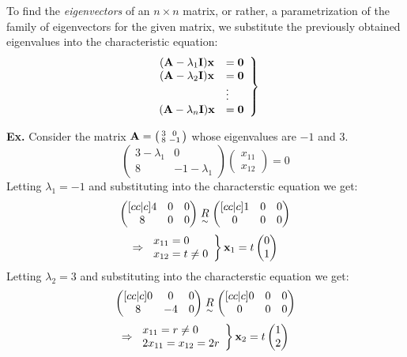 
To find the \emph{eigenvectors} of an $n \times n$ matrix, or rather, a
parametrization of the family of eigenvectors for the given matrix, we
substitute the previously obtained eigenvalues into the characteristic
equation:
\[\left.\begin{array}{clr}
    (\mathbf{A} - \lambda_1\mathbf{I})\mathbf{x} &= \mathbf{0}\\
    (\mathbf{A} - \lambda_2\mathbf{I})\mathbf{x} &= \mathbf{0}\\
                                        &\vdots\\
    (\mathbf{A} - \lambda_n\mathbf{I})\mathbf{x} &= \mathbf{0}
\end{array}\right\}\]

\textbf{Ex.}
Consider the matrix $\mathbf{A} = \left(\begin{smallmatrix} 3 & 0\\ 8 & -1 \end{smallmatrix}\right)$ whose eigenvalues are $-1$ and 3.
\[\begin{pmatrix} 3 - \lambda_1 & 0\\8 & -1 -\lambda_1 \end{pmatrix}
 \begin{pmatrix} x_{11}\\x_{12}\end{pmatrix} = 0\]
Letting $\lambda_1 = -1$ and substituting into the characterstic equation we
get: 
\[\begin{pmatrix}[cc|c] 4 & 0 & 0\\ 8 & 0 & 0 \end{pmatrix} \mathrel{\underset{\sim}{R}} \begin{pmatrix}[cc|c] 1 & 0 & 0\\ 0 & 0 & 0 \end{pmatrix}\]
\[\Rightarrow \left.\begin{array}{lr}
    x_{11}= 0 \\
    x_{12}= t \neq 0
\end{array}\right\}\mathbf{x}_1 = t \begin{pmatrix} 0\\1\end{pmatrix} \]
Letting $\lambda_2 = 3$ and substituting into the characterstic equation we get: 
\[\begin{pmatrix}[cc|c] 0 & 0 & 0\\ 8 & -4 & 0 \end{pmatrix} \mathrel{\underset{\sim}{R}}
 \begin{pmatrix}[cc|c] 0 & 0 & 0\\ 0 & 0 & 0 \end{pmatrix}\]
\[\Rightarrow \left.\begin{array}{lr}
    x_{11}= r \neq 0 \\
    2x_{11} = x_{12} = 2r
\end{array}\right\}\mathbf{x}_2 = t \begin{pmatrix} 1\\2\end{pmatrix} \]

